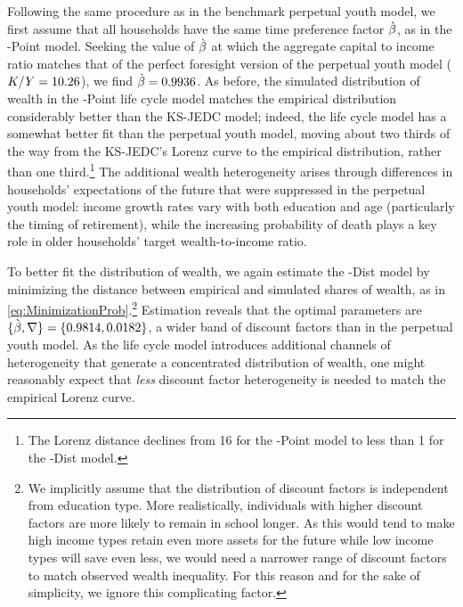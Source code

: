 \documentclass[12pt,titlepage]{econtex}
\begin{document}
Following the same procedure as in the benchmark perpetual youth model, we first assume that all households have the same time preference factor $\grave{\beta}$, as in the \Discount-Point model.  Seeking the value of $\grave{\beta}$ at which the aggregate capital to income ratio  matches that of the perfect foresight version of the perpetual youth model ($K/Y=10.26$), we find $\grave{\beta} = 0.9936$.  As before, the simulated distribution of wealth in the \Discount-Point life cycle model matches the empirical distribution considerably better than the KS-JEDC model; indeed, the life cycle model has a somewhat better fit than the perpetual youth model, moving about two thirds of the way from the KS-JEDC's Lorenz curve to the empirical distribution, rather than one third.\footnote{The Lorenz distance declines from 16 for the \Discount-Point model to less than 1 for the \Discount-Dist model.}
The additional wealth heterogeneity arises through differences in households' expectations of the future that were suppressed in the perpetual youth model: income growth rates vary with both education and age (particularly the timing of retirement), while the increasing probability of death plays a key role in older households' target wealth-to-income ratio.

To better fit the distribution of wealth, we again estimate the \Discount-Dist model by minimizing the distance between empirical and simulated shares of wealth, as in \eqref{eq:MinimizationProb}.\footnote{We implicitly assume that the distribution of discount factors is independent from education type.  More realistically, individuals with higher discount factors are more likely to remain in school longer.  As this would tend to make high income types retain even more assets for the future while low income types will save even less, we would need a narrower range of discount factors to match observed wealth inequality.  For this reason and for the sake of simplicity, we ignore this complicating factor.}   Estimation reveals that the optimal parameters are $\{\grave{\beta},\nabla\} = \{0.9814, 0.0182\}$, a wider band of discount factors than in the perpetual youth model.  As the life cycle model introduces additional channels of heterogeneity that generate a concentrated distribution of wealth, one might reasonably expect that \textit{less} discount factor heterogeneity is needed to match the empirical Lorenz curve.
\end{document}
